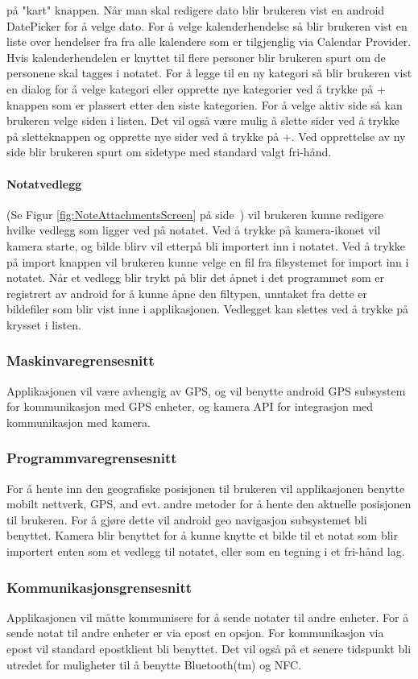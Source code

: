 \documentclass[a4paper, 12pt]{article}
\begin{document}
på "kart" knappen. Når man skal redigere dato blir brukeren vist en android DatePicker for å velge dato. For å velge kalenderhendelse så blir brukeren vist en liste over hendelser fra fra alle kalendere som er tilgjenglig via Calendar Provider. Hvis kalenderhendelen er knyttet til flere personer blir brukeren spurt om de personene skal tagges i notatet. For å legge til en ny kategori så blir brukeren vist en dialog for å velge kategori eller opprette nye kategorier ved å trykke på + knappen som er plassert etter den siste kategorien. For å velge aktiv side så kan brukeren velge siden i listen. Det vil også være mulig å slette sider ved å trykke på sletteknappen og opprette nye sider ved å trykke på +. Ved opprettelse av ny side blir brukeren spurt om sidetype med standard valgt fri-hånd.

\paragraph{Notatvedlegg} (Se Figur \ref{fig:NoteAttachmentsScreen} på side~\pageref{fig:NoteAttachmentsScreen}) vil brukeren kunne redigere hvilke vedlegg som ligger ved på notatet. Ved å trykke på kamera-ikonet vil kamera starte, og bilde blirv vil etterpå bli importert inn i notatet. Ved å trykke på import knappen vil brukeren kunne velge en fil fra filsystemet for import inn i notatet. Når et vedlegg blir trykt på blir det åpnet i det programmet som er registrert av android for å kunne åpne den filtypen, unntaket fra dette er bildefiler som blir vist inne i applikasjonen. Vedlegget kan slettes ved å trykke på krysset i listen.

\subsubsection{Maskinvaregrensesnitt}
Applikasjonen vil være avhengig av GPS, og vil benytte android GPS subsystem for kommunikasjon med GPS enheter, og kamera API for integrasjon med kommunikasjon med kamera.

\subsubsection{Programmvaregrensesnitt}
For å hente inn den geografiske posisjonen til brukeren vil applikasjonen benytte mobilt nettverk, GPS, and evt. andre metoder for å hente den aktuelle posisjonen til brukeren. For å gjøre dette vil android geo navigasjon subsystemet bli benyttet. Kamera blir benyttet for å kunne knytte et bilde til et notat som blir importert enten som et vedlegg til notatet, eller som en tegning i et fri-hånd lag.

\subsubsection{Kommunikasjonsgrensesnitt}
Applikasjonen vil måtte kommunisere for å sende notater til andre enheter. For å sende notat til andre enheter er via epost en opsjon. For kommunikasjon via epost vil standard epostklient bli benyttet. Det vil også på et senere tidspunkt bli utredet for muligheter til å benytte Bluetooth(tm) og NFC.
\end{document}
